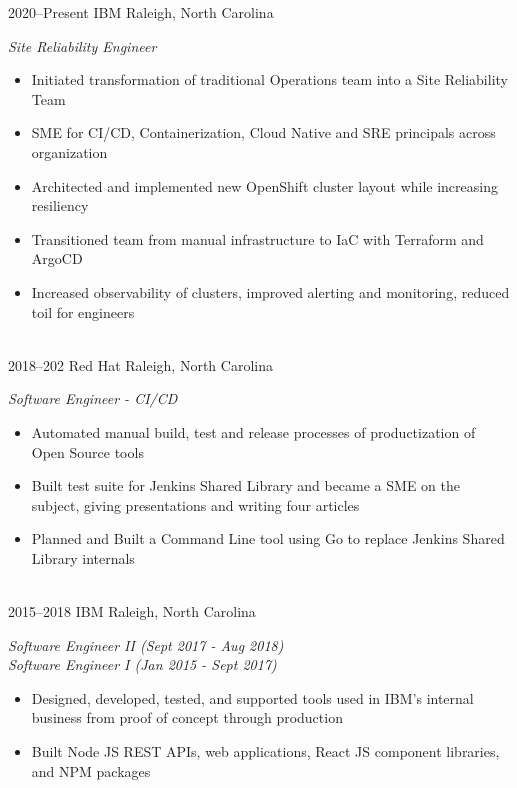 \documentclass[]{friggeri-cv} %
\begin{document}
\begin{entrylist}
\entry
{2020--Present}
{IBM}
{Raleigh, North Carolina}
{\emph{Site Reliability Engineer}
    \begin{itemize}
        \item Initiated transformation of traditional Operations team into a Site Reliability Team
        \item SME for CI/CD, Containerization, Cloud Native and SRE principals across organization
        \item Architected and implemented new OpenShift cluster layout while increasing resiliency
        \item Transitioned team from manual infrastructure to IaC with Terraform and ArgoCD
        \item Increased observability of clusters, improved alerting and monitoring, reduced toil for engineers
    \end{itemize}}\\

\entry
{2018--202}
{Red Hat}
{Raleigh, North Carolina}
{\emph{Software Engineer - CI/CD}
 \begin{itemize}
        \item Automated manual build, test and release processes of productization of Open Source tools
        \item Built test suite for Jenkins Shared Library and became a SME on the subject, giving presentations and writing four articles
        \item Planned and Built a Command Line tool using Go to replace Jenkins Shared Library internals
    \end{itemize}}\\

\entry
{2015--2018}
{IBM}
{Raleigh, North Carolina}
{\emph{Software Engineer II (Sept 2017 - Aug 2018)} \\
\emph{Software Engineer I (Jan 2015 - Sept 2017)}
\begin{itemize}
        \item Designed, developed, tested, and supported tools used in IBM's internal business from proof of concept through production
        \item Built Node JS REST APIs, web applications, React JS component libraries, and NPM packages
    \end{itemize}}\\

\end{entrylist}
\end{document}
